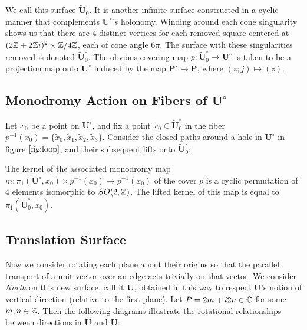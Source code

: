 \documentclass[]{article}
\def\bU{\mathbf{U}} \def\btU{\tilde{\bU}} \def\bUs{\bU^\circ}
\begin{document}
We call this surface $\btU_0$. It is another infinite surface constructed in a cyclic manner that complements $\bUs$'s holonomy. Winding around each cone singularity shows us that there are 4 distinct vertices for each removed square centered at $(2\mathbb{Z}+2\mathbb{Z} i)^2\times \mathbb{Z}/4\mathbb{Z}$, each of cone angle $6\pi$. The surface with these singularities removed is denoted $\btU_0^\circ$. The obvious covering map $p:\btU_0^\circ\rightarrow\bUs$ is taken to be a projection map onto $\bUs$ induced by the map $\mathbf{P}'\hookrightarrow \mathbf{P}$, where $(z;j)\mapsto(z)$.



\subsection{Monodromy Action on Fibers of $\bUs$}
Let $x_0$ be a point on $\bU^\circ$, and fix a point $\tilde{x}_0\in\btU_0^\circ$ in the fiber $p^{-1}(x_0)=\{\tilde{x}_0,\tilde{x}_1,\tilde{x}_2,\tilde{x}_3\}$. Consider the closed paths around a hole in $\bUs$ in figure $\ref{fig:loop}$, and their subsequent lifts onto $\btU_0^\circ$:


The kernel of the associated monodromy map $m:\pi_1(\bUs,x_0)\times p^{-1}(x_0)\rightarrow p^{-1}(x_0)$ of the cover $p$ is a cyclic permutation of 4 elements isomorphic to $SO(2,\mathbb{Z})$. The lifted kernel of this map is equal to $\pi_1(\btU_0^\circ,\tilde{x}_0)$. 

\subsection{Translation Surface}
Now we consider rotating each plane about their origins so that the parallel transport of a unit vector over an edge acts trivially on that vector. We consider \emph{North} on this new surface, call it $\btU$, obtained in this way to respect $\bU$'s notion of vertical direction (relative to the first plane). Let $P=2m+i2n\in \mathbb{C}$ for some $m,n\in\mathbb{Z}$. Then the following diagrams illustrate the rotational relationships between directions in $\btU$ and $\bU$:
\end{document}
